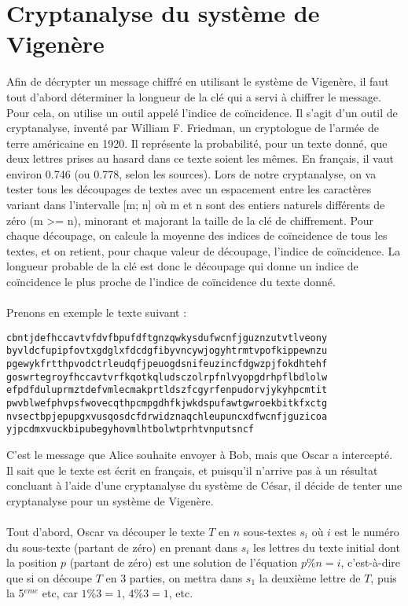 	\section{Cryptanalyse du système de Vigenère}
		Afin de décrypter un message chiffré en utilisant le système de Vigenère, il faut tout d’abord déterminer la longueur de la clé qui a servi à chiffrer le message. Pour cela, on utilise un outil appelé l’indice de coïncidence.
		Il s’agit d’un outil de cryptanalyse, inventé par William F. Friedman, un cryptologue de l’armée de terre américaine en 1920. Il représente la probabilité, pour un texte donné, que deux lettres prises au hasard dans ce texte soient les mêmes.
		En français, il vaut environ 0.746 (ou 0.778, selon les sources).
		Lors de notre cryptanalyse, on va tester tous les découpages de textes avec un espacement entre les caractères variant dans l’intervalle [m; n] où m et n sont des entiers naturels différents de zéro (m >= n), minorant et majorant la taille de la clé de chiffrement. Pour chaque découpage, on calcule la moyenne des indices de coïncidence de tous les textes, et on retient, pour chaque valeur de découpage, l’indice de coïncidence. La longueur probable de la clé est donc le découpage qui donne un indice de coïncidence le plus proche de l’indice de coïncidence du texte donné.\\
		\\
		Prenons en exemple le texte suivant :
		\begin{lstlisting}
cbntjdefhccavtvfdvfbpufdftgnzqwkysdufwcnfjguznzutvtlveony
byvldcfupipfovtxgdglxfdcdgfibyvncywjogyhtrmtvpofkippewnzu
pgewykfrtthpvodctrleudqfjpeuogdsnifeuzincfdgwzpjfokdhtehf
goswrtegroyfhccavtvrfkqotkqludsczolrpfnlvyopgdrhpflbdlolw
efpdfduluprmztdefvmlecmakprtldszfcgyrfenpudorvjykyhpcmtit
pwvblwefphvpsfwovecqthpcmpgdhfkjwkdspufawtgwroekbitkfxctg
nvsectbpjepupgxvusqosdcfdrwidznaqchleupuncxdfwcnfjguzicoa
yjpcdmxvuckbipubegyhovmlhtbolwtprhtvnputsncf
		\end{lstlisting}
		C'est le message que Alice souhaite envoyer à Bob, mais que Oscar a intercepté. Il sait que le texte est écrit en français, et puisqu'il n'arrive pas à un résultat concluant à l'aide d'une cryptanalyse du système de César, il décide de tenter une cryptanalyse pour un système de Vigenère.\\
		\\
		Tout d'abord, Oscar va découper le texte $T$ en $n$ sous-textes $s_i$ où $i$ est le numéro du sous-texte (partant de zéro) en prenant dans $s_i$ les lettres du texte initial dont la position $p$ (partant de zéro) est une solution de l'équation $p \% n = i$, c'est-à-dire que si on découpe $T$ en 3 parties, on mettra dans $s_1$ la deuxième lettre de $T$, puis la 5$^{eme}$ etc, car $1 \% 3 = 1$, $4 \% 3 = 1$, etc.\\
